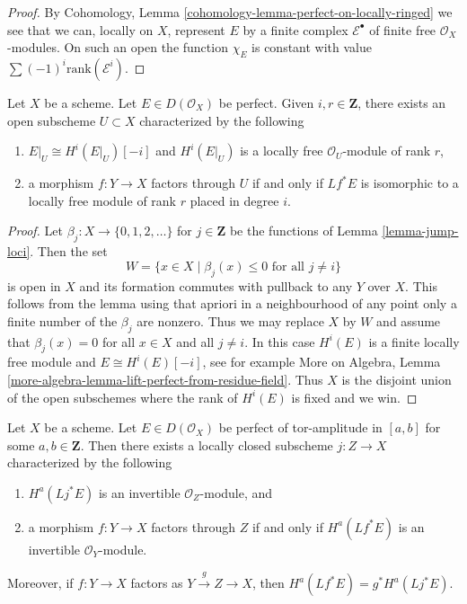 \begin{proof}
By Cohomology, Lemma
\ref{cohomology-lemma-perfect-on-locally-ringed}
we see that we can, locally on $X$, represent $E$ by a finite
complex $\mathcal{E}^\bullet$ of finite free $\mathcal{O}_X$-modules.
On such an open the function $\chi_E$ is constant with value
$\sum (-1)^i \text{rank}(\mathcal{E}^i)$.
\end{proof}

\begin{lemma}
\label{lemma-open-where-cohomology-in-degree-i-rank-r}
Let $X$ be a scheme. Let $E \in D(\mathcal{O}_X)$ be perfect.
Given $i, r \in \mathbf{Z}$, there exists an
open subscheme $U \subset X$ characterized by the following
\begin{enumerate}
\item $E|_U \cong H^i(E|_U)[-i]$ and $H^i(E|_U)$ is a locally free
$\mathcal{O}_U$-module of rank $r$,
\item a morphism $f : Y \to X$ factors through $U$ if and only if
$Lf^*E$ is isomorphic to a locally free module of rank $r$
placed in degree $i$.
\end{enumerate}
\end{lemma}

\begin{proof}
Let $\beta_j : X \to \{0, 1, 2, \ldots\}$ for $j \in \mathbf{Z}$
be the functions of Lemma \ref{lemma-jump-loci}. Then the set
$$
W = \{x \in X \mid \beta_j(x) \leq 0\text{ for all }j \not = i\}
$$
is open in $X$ and its formation commutes with pullback to any
$Y$ over $X$. This follows from the lemma using that
apriori in a neighbourhood of any point only a finite number
of the $\beta_j$ are nonzero. Thus we may replace $X$ by $W$
and assume that $\beta_j(x) = 0$ for all $x \in X$ and all $j \not = i$.
In this case $H^i(E)$ is a finite locally free module and
$E \cong H^i(E)[-i]$, see for example 
More on Algebra, Lemma
\ref{more-algebra-lemma-lift-perfect-from-residue-field}.
Thus $X$ is the disjoint union of the open subschemes where the
rank of $H^i(E)$ is fixed and we win.
\end{proof}

\begin{lemma}
\label{lemma-locally-closed-where-H0-invertible}
Let $X$ be a scheme. Let $E \in D(\mathcal{O}_X)$ be perfect
of tor-amplitude in $[a, b]$ for some $a, b \in \mathbf{Z}$.
Then there exists a locally closed subscheme $j : Z \to X$
characterized by the following
\begin{enumerate}
\item $H^a(Lj^*E)$ is an invertible $\mathcal{O}_Z$-module, and
\item a morphism $f : Y \to X$ factors through $Z$ if and only if
$H^a(Lf^*E)$ is an invertible $\mathcal{O}_Y$-module.
\end{enumerate}
Moreover, if $f : Y \to X$ factors as $Y \xrightarrow{g} Z \to X$, then
$H^a(Lf^*E) = g^*H^a(Lj^*E)$.
\end{lemma}

